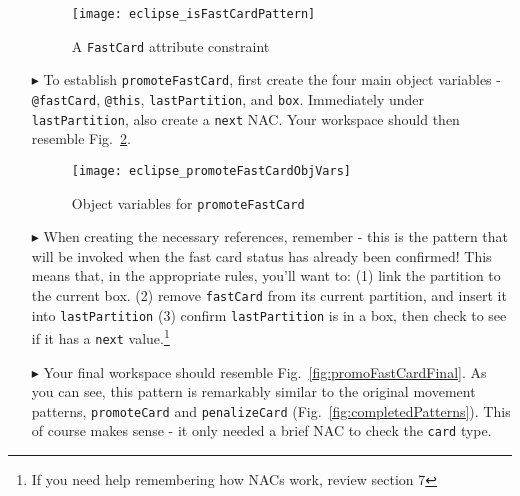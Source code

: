 \begin{itemize}
\begin{figure}[htp]
\begin{center}
  \texttt{[image: eclipse\_isFastCardPattern]}
  \caption{A \texttt{FastCard} attribute constraint}
  \label{fig:isFastCardPattern}
\end{center}
\end{figure}

\item[$\blacktriangleright$] To establish \texttt{promoteFastCard}, first create the four main object variables - \texttt{@fastCard}, \texttt{@this},
\texttt{lastPartition}, and \texttt{box}. Immediately under \texttt{lastPartition}, also create a \texttt{next} NAC.
Your workspace should then resemble Fig.~\ref{fig:objVarFastCard}.

\vspace{0.5cm}

\begin{figure}[htp]
\begin{center}
  \texttt{[image: eclipse\_promoteFastCardObjVars]}
  \caption{Object variables for \texttt{promoteFastCard}}
  \label{fig:objVarFastCard}
\end{center}
\end{figure}

\item[$\blacktriangleright$] When creating the necessary references, remember - this is the pattern that will be invoked when the fast card status has
already been confirmed! This means that, in the appropriate rules, you'll want to:
(1) link the partition to the current box.
(2) remove \texttt{fastCard} from its current partition, and insert it into \texttt{lastPartition}
(3) confirm \texttt{lastPartition} is in a box, then check to see if it has a \texttt{next} value.\footnote{If you need help remembering how NACs work, review
section 7}

\vspace{0.5cm}

\item[$\blacktriangleright$] Your final workspace should resemble Fig.~\ref{fig:promoFastCardFinal}. As you can see, this pattern is remarkably similar to the
original movement patterns, \texttt{promoteCard} and \texttt{penalizeCard} (Fig.~\ref{fig:completedPatterns}). This of course makes sense - it only
needed a brief NAC to check the \texttt{card} type.

\newpage

\vspace*{1cm}


\end{itemize}
